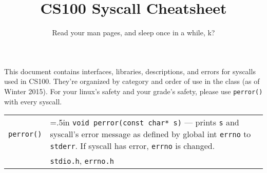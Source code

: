 \documentclass{article}
\title{CS100 Syscall Cheatsheet}
\author{Read your man pages, and sleep once in a while, k?}
\date{}
\newcommand{\indenth}[1][.5]{\hangindent=#1in
                         \hangafter=1 }
\begin{document}
\maketitle

\large This document contains interfaces, libraries, descriptions, and errors for 
syscalls used in CS100. They're organized by category and order of use in the class (as of Winter 2015). For your linux's safety and 
your grade's safety, please use \texttt{perror()} with every syscall. 

\medskip
\begin{tabu} {p{1in}|p{5.7in}}
\texttt{perror()} & \indenth\texttt{void perror(const char* s)} --- prints \texttt{s} and syscall's error message as defined by global int \texttt{errno} to \texttt{stderr}. If syscall has error, \texttt{errno} is changed.
    \\
& \texttt{stdio.h}, \texttt{errno.h}
\end{tabu}
\normalsize
\end{document}
